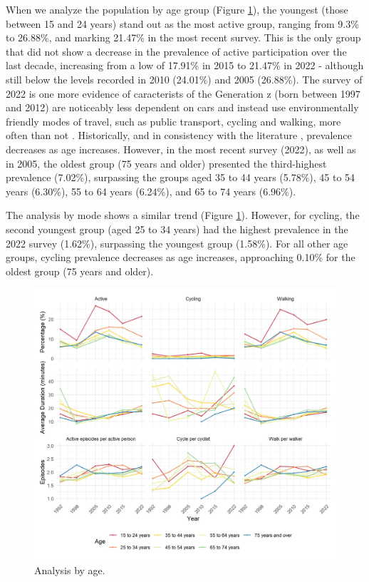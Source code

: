 \documentclass[preprint, 3p,
authoryear]{elsarticle} %
\begin{document}
When we analyze the population by age group (Figure
\ref{fig:age-combined-figure}), the youngest (those between 15 and 24
years) stand out as the most active group, ranging from 9.3\% to
26.88\%, and marking 21.47\% in the most recent survey. This is the only
group that did not show a decrease in the prevalence of active
participation over the last decade, increasing from a low of 17.91\% in
2015 to 21.47\% in 2022 - although still below the levels recorded in
2010 (24.01\%) and 2005 (26.88\%). The survey of 2022 is one more
evidence of caracterists of the Generation z (born between 1997 and
2012) \citep{dimock2019} are noticeably less dependent on cars and
instead use environmentally friendly modes of travel, such as public
transport, cycling and walking, more often than not
\citep{haseeb2024, grimsrud2014, kuhnimhof2011}. Historically, and in
consistency with the literature \citep{bryan2009, borhani2024},
prevalence decreases as age increases. However, in the most recent
survey (2022), as well as in 2005, the oldest group (75 years and older)
presented the third-highest prevalence (7.02\%), surpassing the groups
aged 35 to 44 years (5.78\%), 45 to 54 years (6.30\%), 55 to 64 years
(6.24\%), and 65 to 74 years (6.96\%).

The analysis by mode shows a similar trend (Figure
\ref{fig:age-combined-figure}). However, for cycling, the second
youngest group (aged 25 to 34 years) had the highest prevalence in the
2022 survey (1.62\%), surpassing the youngest group (1.58\%). For all
other age groups, cycling prevalence decreases as age increases,
approaching 0.10\% for the oldest group (75 years and older).

\begin{figure}
\includegraphics[width=1\linewidth]{figures/combined_plot_age} \caption{Analysis by age.}\label{fig:age-combined-figure}
\end{figure}
\end{document}
